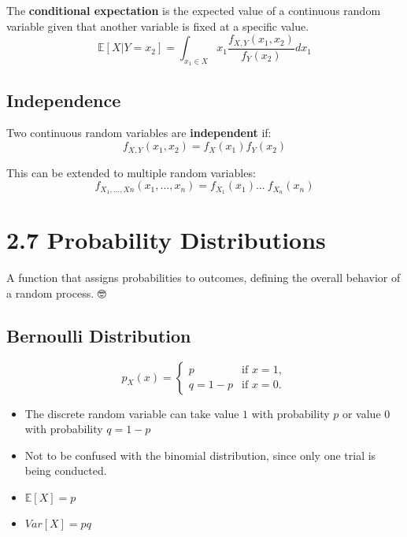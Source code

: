 \documentclass[
  letterpaper,
  DIV=11,
  numbers=noendperiod]{scrreprt}
\providecommand{\tightlist}{%
  \setlength{\itemsep}{0pt}\setlength{\parskip}{0pt}}\usepackage{longtable,booktabs,array}
\begin{document}
The \textbf{conditional expectation} is the expected value of a
continuous random variable given that another variable is fixed at a
specific value. \[ 
\mathbb{E}[X| Y = x_{2}] = \int_{x_{1} \in X} x_{1} \frac{f_{X,Y}(x_{1}, x_{2})}{f_{Y}(x_{2})} dx_{1} 
\]

\section{Independence}\label{independence-2}

Two continuous random variables are \textbf{independent} if: \[ 
f_{X,Y}(x_{1}, x_{2}) = f_{X}(x_{1}) f_{Y}(x_{2}) 
\]

This can be extended to multiple random variables: \[ 
f_{X_{1},...,X{n}}(x_{1}, ..., x_{n}) = f_{X_{1}}(x_{1}) ... \ f_{X_{n}}(x_{n}) 
\]

\chapter{2.7 Probability Distributions}\label{probability-distributions}

\begin{tcolorbox}[enhanced jigsaw, arc=.35mm, toprule=.15mm, leftrule=.75mm, colback=white, left=2mm, colframe=quarto-callout-note-color-frame, rightrule=.15mm, opacityback=0, breakable, bottomrule=.15mm]

A function that assigns probabilities to outcomes, defining the overall
behavior of a random process. 🤓

\end{tcolorbox}

\section{Bernoulli Distribution}\label{bernoulli-distribution}

\[
p_{X}(x) =
\begin{cases}
    p & \text{if } x = 1, \\
    q = 1-p & \text{if } x = 0.
\end{cases}
\]

\begin{itemize}
\tightlist
\item
  The discrete random variable can take value \(1\) with probability
  \(p\) or value \(0\) with probability \(q = 1 - p\)
\item
  Not to be confused with the binomial distribution, since only one
  trial is being conducted.
\item
  \(\mathbb{E}[X] = p\)
\item
  \(Var[X] = pq\)
\end{itemize}
\end{document}
